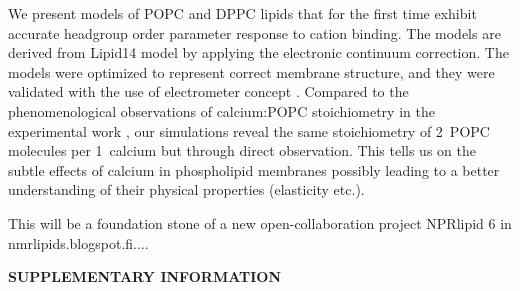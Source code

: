 \documentclass[aip,jcp,twocolumn]{revtex4}
\begin{document}
We present models of POPC and DPPC lipids that for the first time exhibit accurate headgroup order parameter response to cation binding. 
The models are derived from Lipid14 model \cite{dickson14} by applying the electronic continuum correction. 
The models were optimized to represent correct membrane structure, 
and they were validated with the use of electrometer concept \cite{seelig87,Altenbach85,Altenbach84}. 
Compared to the phenomenological observations of calcium:POPC stoichiometry in the experimental work \cite{Altenbach84}, 
our simulations reveal the same stoichiometry of 2~POPC molecules per 1~calcium but through direct observation. 
This tells us on the subtle effects of calcium in phospholipid membranes 
possibly leading to a better understanding of their physical properties (elasticity etc.). 

This will be a foundation stone of a new open-collaboration project NPRlipid 6 in nmrlipids.blogspot.fi....
















%

\begin{acknowledgments}
\end{acknowledgments}
\newpage
\appendix
\begin{center}
{\bf SUPPLEMENTARY INFORMATION}
\end{center}





\listoftodos
\end{document}
